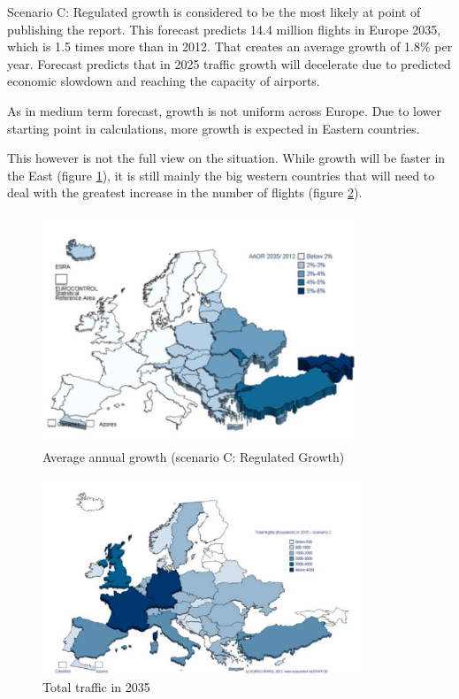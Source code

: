 Scenario C: Regulated growth is considered to be the most likely at point of publishing the report. This forecast predicts 14.4 million flights in Europe 2035, which is 1.5 times more than in 2012. That creates an average growth of 1.8\% per year. Forecast predicts that in 2025 traffic growth will decelerate due to predicted economic slowdown and reaching the capacity of airports.

As in medium term forecast, growth is not uniform across Europe. Due to lower starting point in calculations, more growth is expected in Eastern countries.

This however is not the full view on the situation. While growth will be faster in the East (figure \ref{scenarioC}), it is still mainly the big western countries that will need to deal with the greatest increase in the number of flights (figure \ref{totalflights}).

\begin{figure}[h!]
\centering %
\includegraphics[width=0.85\textwidth]{Pictures/scenC.png}
\caption{Average annual growth (scenario C: Regulated Growth) \citep{eurocontrol}}
\label{scenarioC}
\end{figure}

\begin{figure}[h!]
\centering %
\includegraphics[width=0.85\textwidth]{Pictures/total2035.png}
\caption{Total traffic in 2035 \citep{eurocontrol}}
\label{totalflights}
\end{figure}

